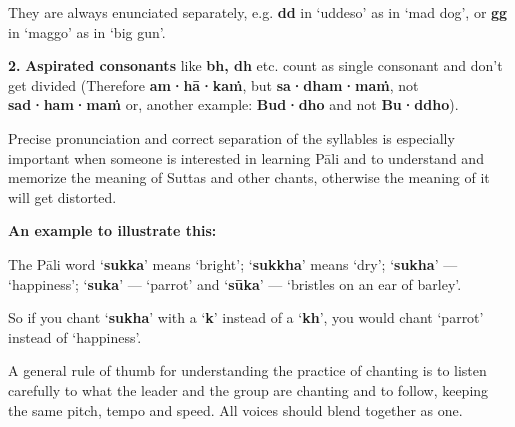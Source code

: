 \vspace*{\parskip}

They are always enunciated separately, e.g. \textbf{dd} in ‘uddeso’ as
in ‘mad dog’, or \textbf{gg} in ‘maggo’ as in ‘big gun’.

\textbf{2.} \textbf{Aspirated consonants} like \textbf{bh, dh} etc.
count as single consonant and don't get divided (Therefore
\textbf{am·hā·kaṁ}, but \textbf{sa·dham·maṁ}, not \textbf{sad·ham·maṁ}
or, another example: \textbf{Bud·dho} and not \textbf{Bu·ddho}).

Precise pronunciation and correct separation of the syllables is
especially important when someone is interested in learning Pāli and to
understand and memorize the meaning of Suttas and other chants,
otherwise the meaning of it will get distorted.

\textbf{An example to illustrate this:}

The Pāli word ‘\textbf{sukka}’ means ‘bright’; ‘\textbf{sukkha}’ means
‘dry’; ‘\textbf{sukha}’ --- ‘happiness’; ‘\textbf{suka}’ --- ‘parrot’ and
‘\textbf{sūka}’ --- ‘bristles on an ear of barley’.

So if you chant ‘\textbf{sukha}’ with a ‘\textbf{k}’ instead of a
‘\textbf{kh}’, you would chant ‘parrot’ instead of ‘happiness’.

A general rule of thumb for understanding the practice of chanting is to
listen carefully to what the leader and the group are chanting and to
follow, keeping the same pitch, tempo and speed. All voices should blend
together as one.
